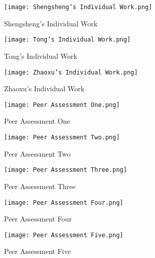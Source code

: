 \documentclass[12pt]{amsart}
\begin{document}
\begin{figure}[htbp]
\texttt{[image: Shengsheng's Individual Work.png]}
\caption{Shengsheng's Individual Work}
\end{figure}

\begin{figure}[htbp]
\texttt{[image: Tong's Individual Work.png]}
\caption{Tong's Individual Work}
\end{figure}

\begin{figure}[htbp]
\texttt{[image: Zhaoxu's Individual Work.png]}
\caption{Zhaoxu's Individual Work}
\end{figure}

\clearpage

\begin{figure}[htbp]
\texttt{[image: Peer Assessment One.png]}
\caption{Peer Assessment One}
\end{figure}

\clearpage

\begin{figure}[htbp]
\texttt{[image: Peer Assessment Two.png]}
\caption{Peer Assessment Two}
\end{figure}

\clearpage

\begin{figure}[htbp]
\texttt{[image: Peer Assessment Three.png]}
\caption{Peer Assessment Three}
\end{figure}

\clearpage

\begin{figure}[htbp]
\texttt{[image: Peer Assessment Four.png]}
\caption{Peer Assessment Four}
\end{figure}

\clearpage

\begin{figure}[htbp]
\texttt{[image: Peer Assessment Five.png]}
\caption{Peer Assessment Five}
\end{figure}
\end{document}
